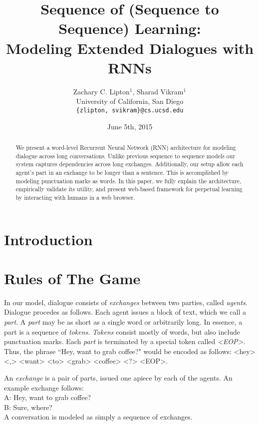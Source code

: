 \documentclass[]{article}
\begin{document}

\title{Sequence of (Sequence to Sequence) Learning: \\
Modeling Extended Dialogues with RNNs}

\author{Zachary C. Lipton$^1$, Sharad Vikram$^1$\\
University of California, San Diego\\
\texttt{\{zlipton, svikram\}@cs.ucsd.edu}
}

\date{June 5th, 2015}
\maketitle


\begin{abstract}
We present a word-level Recurrent Neural Network (RNN) architecture
for modeling dialogue across long conversations.
Unlike previous sequence to sequence models
our system captures dependencies across long exchanges.
Additionally, our setup allow each agent's part in an exchange
to be longer than a sentence.
This is accomplished by modeling punctuation marks as words.
In this paper, we fully explain the architecture,
empirically validate its utility,
and present web-based framework for perpetual learning
by interacting with humans in a web browser.


\end{abstract}


\section{Introduction}
\section{Rules of The Game}
In our model, dialogue consists
of \emph{exchanges} between two parties, called \emph{agents}.
Dialogue procedes as follows.
Each agent issues a block of text,
which we call a \emph{part}.
A \emph{part} may be as short as a single word or arbitrarily long.
In essence, a part is a sequence of \emph{tokens}.
\emph{Tokens} consist mostly of words,
but also include punctuation marks.
Each \emph{part} is terminated by a special token called \emph{<EOP>}.
Thus, the phrase ``Hey, want to grab coffee?"
would be encoded as follows: <hey> <,> <want> <to> <grab> <coffee> <?> <EOP>.

An \emph{exchange} is a pair of parts, issued one apiece by each of the agents.
An example exchange follows: \\
A: Hey, want to grab coffee?\\
B: Sure, where?\\
A conversation is modeled as simply a sequence of exchanges.
\end{document}
